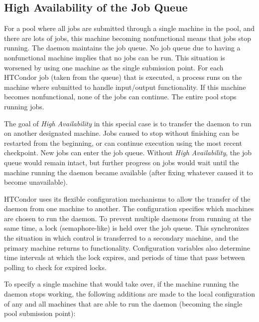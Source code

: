 \subsection{\label{sec:HA-schedd} High Availability of the Job Queue} 


For a pool where all jobs are submitted through
a single machine in the pool,
and there are lots of jobs,
this machine becoming nonfunctional means that
jobs stop running.
The  daemon maintains the job queue.
No job queue due to having a nonfunctional machine
implies that no jobs can be run.
This situation is worsened by using one machine
as the single submission point.
For each HTCondor job (taken from the queue) that is executed,
a  process runs on the machine where submitted
to handle input/output functionality.
If this machine becomes nonfunctional, none of the jobs can
continue.
The entire pool stops running jobs.

The goal of \emph{High Availability} in this special case is
to transfer the  daemon to run on another
designated machine.
Jobs caused to stop without finishing can be restarted from the
beginning, or can continue execution using the most recent checkpoint.
New jobs can enter the job queue.
Without \emph{High Availability},
the job queue would remain intact, but further progress on jobs
would wait until the machine running the  daemon
became available (after fixing whatever caused it to become
unavailable).

HTCondor uses its flexible configuration mechanisms to allow
the transfer of the  daemon from one machine
to another.
The configuration specifies
which machines are chosen to run the  daemon.
To prevent multiple  daemons from running at the same time,
a lock (semaphore-like) is held over the job queue.
This synchronizes  the situation in which control is
transferred to a secondary machine,
and the primary machine returns to functionality.
Configuration variables also determine time intervals at which 
the lock expires,
and periods of time that pass between polling to check
for expired locks.

To specify a single machine that would take over, if the
machine running the  daemon stops working,
the following additions are made to the local configuration
of any and all machines that are able to run the  daemon
(becoming the single pool submission point): 

